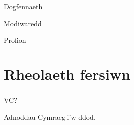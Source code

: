 \documentclass{beamer}
\begin{document}
\begin{frame}
Dogfennaeth
\end{frame}

\begin{frame}
Modiwaredd
\end{frame}

\begin{frame}
Profion
\end{frame}

\begin{frame}
  \begin{center}
    \vspace{0.8cm}
    
  \end{center}
\end{frame}

\section[]{Rheolaeth fersiwn}
\begin{frame}
\frametitle{\hfill}
\end{frame}

\begin{frame}
VC?
\end{frame}

\begin{frame}
Adnoddau Cymraeg i'w ddod.
\end{frame}
\end{document}
